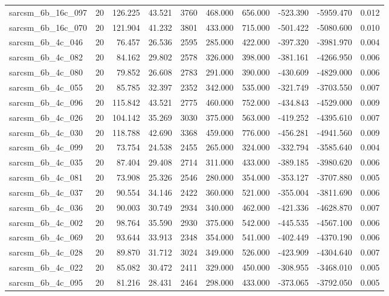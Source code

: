\begin{tabular}{lrrrrrrrrr}
sarcsm\_6b\_16c\_097 & 20 & 126.225 & 43.521 & 3760 & 468.000 & 656.000 & -523.390 & -5959.470 & 0.012 \\
sarcsm\_6b\_16c\_070 & 20 & 121.904 & 41.232 & 3801 & 433.000 & 715.000 & -501.422 & -5080.600 & 0.010 \\
sarcsm\_6b\_4c\_046 & 20 & 76.457 & 26.536 & 2595 & 285.000 & 422.000 & -397.320 & -3981.970 & 0.004 \\
sarcsm\_6b\_4c\_082 & 20 & 84.162 & 29.802 & 2578 & 326.000 & 398.000 & -381.161 & -4266.950 & 0.006 \\
sarcsm\_6b\_4c\_080 & 20 & 79.852 & 26.608 & 2783 & 291.000 & 390.000 & -430.609 & -4829.000 & 0.006 \\
sarcsm\_6b\_4c\_055 & 20 & 85.785 & 32.397 & 2352 & 342.000 & 535.000 & -321.749 & -3703.550 & 0.007 \\
sarcsm\_6b\_4c\_096 & 20 & 115.842 & 43.521 & 2775 & 460.000 & 752.000 & -434.843 & -4529.000 & 0.009 \\
sarcsm\_6b\_4c\_026 & 20 & 104.142 & 35.269 & 3030 & 375.000 & 563.000 & -419.252 & -4395.610 & 0.007 \\
sarcsm\_6b\_4c\_030 & 20 & 118.788 & 42.690 & 3368 & 459.000 & 776.000 & -456.281 & -4941.560 & 0.009 \\
sarcsm\_6b\_4c\_099 & 20 & 73.754 & 24.538 & 2455 & 265.000 & 324.000 & -332.794 & -3585.640 & 0.004 \\
sarcsm\_6b\_4c\_035 & 20 & 87.404 & 29.408 & 2714 & 311.000 & 433.000 & -389.185 & -3980.620 & 0.006 \\
sarcsm\_6b\_4c\_081 & 20 & 73.908 & 25.326 & 2546 & 280.000 & 354.000 & -353.127 & -3707.880 & 0.005 \\
sarcsm\_6b\_4c\_037 & 20 & 90.554 & 34.146 & 2422 & 360.000 & 521.000 & -355.004 & -3811.690 & 0.006 \\
sarcsm\_6b\_4c\_036 & 20 & 90.003 & 30.749 & 2934 & 340.000 & 462.000 & -421.336 & -4628.870 & 0.007 \\
sarcsm\_6b\_4c\_002 & 20 & 98.764 & 35.590 & 2930 & 375.000 & 542.000 & -445.535 & -4567.100 & 0.006 \\
sarcsm\_6b\_4c\_069 & 20 & 93.644 & 33.913 & 2348 & 354.000 & 541.000 & -402.449 & -4370.190 & 0.006 \\
sarcsm\_6b\_4c\_028 & 20 & 89.870 & 31.712 & 3024 & 349.000 & 526.000 & -423.909 & -4304.640 & 0.007 \\
sarcsm\_6b\_4c\_022 & 20 & 85.082 & 30.472 & 2411 & 329.000 & 450.000 & -308.955 & -3468.010 & 0.005 \\
sarcsm\_6b\_4c\_095 & 20 & 81.216 & 28.431 & 2464 & 298.000 & 433.000 & -373.065 & -3792.050 & 0.005 \\

\end{tabular}
